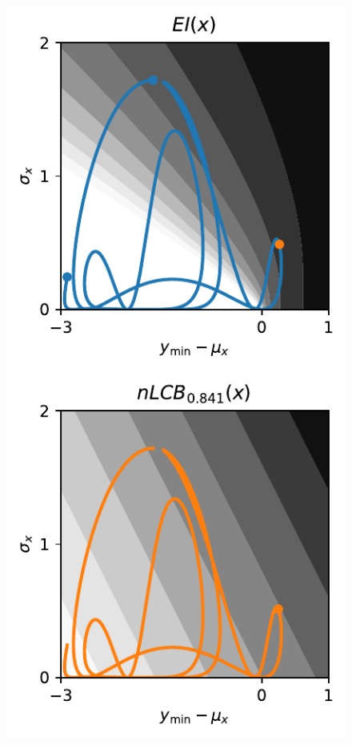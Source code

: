 \begin{figure}[H]
    \centering
    \begin{minipage}[b]{0.32\textwidth}
      \includegraphics[trim=0.2cm 0.2cm 0cm 0.1cm,clip,width=\textwidth]{Pictures/expected_improvement_illustration.pdf}
    \end{minipage}
    \hfill
    \begin{minipage}[b]{0.32\textwidth}
        \includegraphics[trim=0.2cm 0.2cm 0cm 0.1cm,clip,width=\textwidth]{Pictures/neg_lower_confidence_illustration_1.pdf}

\end{minipage}
\end{figure}
